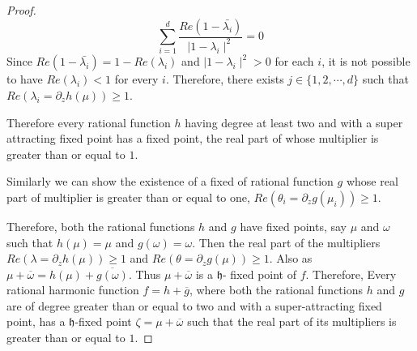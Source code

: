 \documentclass[a4paper,12pt,reqno]{amsart}
\begin{document}
\begin{proof}
\begin{equation}\label{E4}
\displaystyle\sum_{i=1}^{d}\frac{Re(1-\bar{\lambda_{i}})}{\mid 1-\lambda_{i}
\mid^{2}}=0 
\end{equation}
Since $Re(1-\bar{\lambda_{i}})=1-Re(\lambda_{i})$ and $\mid 1-\lambda_{i}\mid^{2}>0$ for each $i$, it is not possible to have $Re(\lambda_{i})<1$ for every $i$. Therefore, there exists $j\in\lbrace1,2,\cdots,d\rbrace$ such that $Re\left( \lambda_{i}=\partial_{z}h(\mu)\right)\geq 1$.

Therefore every rational function $h$ having degree at least two and with a super attracting fixed point has a fixed point, the real part of whose multiplier is greater than or equal to $1$.

Similarly we can show the existence of a fixed of rational function $g$ whose real part of multiplier is greater than or equal to one, $Re\left( \theta_{i}=\partial_{z}g(\mu_{i})\right)\geq 1$.


 
 Therefore, both the rational functions $h$ and $g$ have fixed points, say $\mu$ and $\omega$ such that $h(\mu)=\mu$ and $g(\omega)=\omega$. Then the real part of the multipliers  $Re\left( \lambda=\partial_{z}h(\mu)\right)\geq 1$ and $Re\left( \theta=\partial_{z}g(\mu)\right)\geq 1$. Also as $\mu+\overline{\omega}=h(\mu)+\overline{g(\omega)}$. Thus $\mu+\overline{\omega}$ is a $\mathfrak{h}$- fixed point of $f$. Therefore,   Every rational harmonic function $f=h+\overline{g}$, where both the rational functions $h$ and $g$ are of degree greater than or equal to two and with a super-attracting fixed point, has a $\mathfrak{h}$-fixed point  $\zeta=\mu+\overline{\omega}$ such that the real part of its multipliers is greater than or equal to $1$.
\end{proof}
\end{document}

